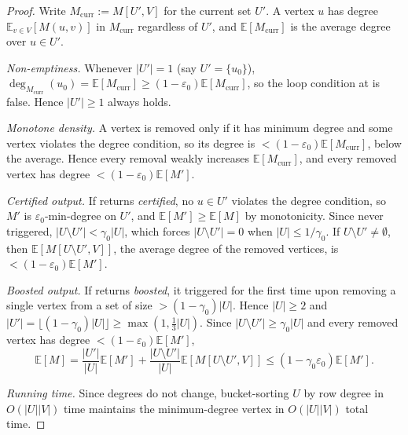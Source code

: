 \documentclass[11pt]{article}
\theoremstyle{definition}
\newcommand{\E}{\mathbb{E}}
\newcommand{\abs}[1]{\left\lvert #1 \right\rvert}
\newcommand{\dens}[1]{\E[#1]}
\begin{document}
\begin{proof}
Write $M_{\text{curr}} := M[U', V]$ for the current set $U'$. A vertex $u$ has degree $\E_{v \in V}[M(u, v)]$ in $M_{\text{curr}}$ regardless of $U'$, and $\dens{M_{\text{curr}}}$ is the average degree over $u \in U'$.

\emph{Non-emptiness.} Whenever $\abs{U'} = 1$ (say $U' = \{u_0\}$), $\deg_{M_{\text{curr}}}(u_0) = \dens{M_{\text{curr}}} \ge (1 - \varepsilon_0)\dens{M_{\text{curr}}}$, so the loop condition at  is false. Hence $\abs{U'} \ge 1$ always holds.

\emph{Monotone density.} A vertex is removed only if it has minimum degree and some vertex violates the degree condition, so its degree is $< (1 - \varepsilon_0)\dens{M_{\text{curr}}}$, below the average. Hence every removal weakly increases $\dens{M_{\text{curr}}}$, and every removed vertex has degree $< (1 - \varepsilon_0)\dens{M'}$.

\emph{Certified output.} If  returns \emph{certified}, no $u \in U'$ violates the degree condition, so $M'$ is $\varepsilon_0$-min-degree on $U'$, and $\dens{M'} \ge \dens{M}$ by monotonicity. Since  never triggered, $\abs{U \setminus U'} < \gamma_0\abs{U}$, which forces $\abs{U \setminus U'} = 0$ when $\abs{U} \le 1/\gamma_0$. If $U \setminus U' \ne \emptyset$, then $\dens{M[U \setminus U', V]}$, the average degree of the removed vertices, is $< (1 - \varepsilon_0)\dens{M'}$.

\emph{Boosted output.} If  returns \emph{boosted}, it triggered for the first time upon removing a single vertex from a set of size $> (1 - \gamma_0)\abs{U}$. Hence $\abs{U} \ge 2$ and $\abs{U'} = \lfloor (1 - \gamma_0)\abs{U} \rfloor \ge \max(1, \frac{1}{3}\abs{U})$. Since $\abs{U \setminus U'} \ge \gamma_0\abs{U}$ and every removed vertex has degree $< (1 - \varepsilon_0)\dens{M'}$,
\[
    \dens{M} = \frac{\abs{U'}}{\abs{U}}\dens{M'} + \frac{\abs{U \setminus U'}}{\abs{U}}\dens{M[U \setminus U', V]} \le (1 - \gamma_0\varepsilon_0)\dens{M'}.
\]

\emph{Running time.} Since degrees do not change, bucket-sorting $U$ by row degree in $O(\abs{U}\abs{V})$ time maintains the minimum-degree vertex in $O(\abs{U}\abs{V})$ total time.
\end{proof}
\end{document}
